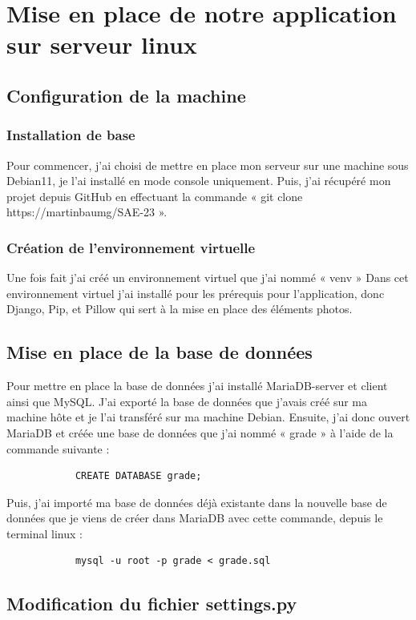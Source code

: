 \documentclass[12pt, a4paper]{article}
\begin{document}
    \section{Mise en place de notre application sur serveur linux}    
        \subsection{Configuration de la machine}
            \subsubsection{Installation de base}
            Pour commencer, j’ai choisi de mettre en place mon serveur sur une machine sous Debian11, je l’ai installé en mode console uniquement. Puis, j’ai récupéré mon projet depuis GitHub en effectuant la commande « git clone https://martinbaumg/SAE-23 ». 
            \newpage
            \subsubsection{Création de l'environnement virtuelle}
            Une fois fait j’ai créé un environnement virtuel que j’ai nommé « venv » 
            Dans cet environnement virtuel j’ai installé pour les prérequis pour l’application, donc Django, Pip, et Pillow qui sert à la mise en place des éléments photos. 
        \subsection{Mise en place de la base de données}
        Pour mettre en place la base de données j’ai installé MariaDB-server et client ainsi que MySQL. J’ai exporté la base de données que j’avais créé sur ma machine hôte et je l’ai transféré sur ma machine Debian. Ensuite, j’ai donc ouvert MariaDB et créée une base de données que j’ai nommé « grade » à l’aide de la commande suivante : 
        \begin{verbatim}
            CREATE DATABASE grade;
        \end{verbatim}
        Puis, j’ai importé ma base de données déjà existante dans la nouvelle base de données que je viens de créer dans MariaDB avec cette commande, depuis le terminal linux : 
        \begin{verbatim}
            mysql -u root -p grade < grade.sql 
        \end{verbatim}
        \subsection{Modification du fichier settings.py}
\end{document}
